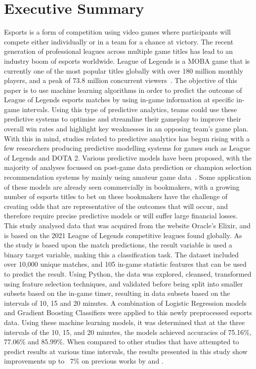 
\chapter*{Executive Summary}\label{ch:executive summary}


Esports is a form of competition using video games where participants will compete either individually or in a team for a chance at victory.
The recent generation of professional leagues across multiple game titles has lead to an industry boom of esports worldwide.
League of Legends is a MOBA game that is currently one of the most popular titles globally with over 180 million monthly players, and a peak of 73.8 million concurrent viewers~\citep{riotplayercount, upcomerworld2021}.
The objective of this paper is to use machine learning algorithms in order to predict the outcome of League of Legends esports matches by using in-game information at specific in-game intervals.
Using this type of predictive analytics, teams could use these predictive systems to optimise and streamline their gameplay to improve their overall win rates and highlight key weaknesses in an opposing team's game plan.
With this in mind, studies related to predictive analytics has begun rising with a few researchers producing predictive modelling systems for games such as League of Legends and DOTA 2.
Various predictive models have been proposed, with the majority of analyses focussed on post-game data prediction or champion selection recommendation systems by mainly using amateur game data~\citep{ani2019victory, shen2022deep}.
Some application of these models are already seen commercially in bookmakers, with a growing number of esports titles to bet on these bookmakers have the challenge of creating odds that are representative of the outcomes that will occur, and therefore require precise predictive models or will suffer large financial losses. \\


This study analysed data that was acquired from the website Oracle's Elixir, and is based on the 2021 League of Legends competitive leagues found globally.
As the study is based upon the match predictions, the result variable is used a binary target variable, making this a classification task.
The dataset included over 10,000 unique matches, and 105 in-game statistic features that can be used to predict the result.
Using Python, the data was explored, cleansed, transformed using feature selection techniques, and validated before being split into smaller subsets based on the in-game timer, resulting in data subsets based on the intervals of 10, 15 and 20 minutes.
A combination of Logistic Regression models and Gradient Boosting Classifiers were applied to this newly preprocessed esports data.
Using these machine learning models, it was determined that at the three intervals of the 10, 15, and 20 minutes, the models achieved accuracies of 75.16\%, 77.06\% and 85.99\%.
When compared to other studies that have attempted to predict results at various time intervals, the results presented in this study show improvements up to ~7\% on previous works by \citet{lee2020predicting} and \citet{silva2018continuous}. \\

